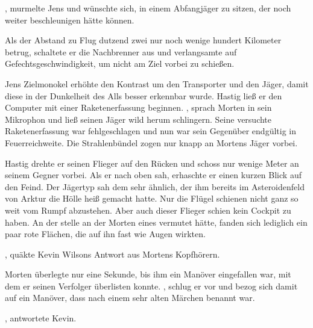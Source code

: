 \par

, murmelte Jens und wünschte sich, in einem Abfangjäger zu sitzen, der noch weiter beschleunigen hätte können.

\par

Als der Abstand zu Flug dutzend zwei nur noch wenige hundert Kilometer betrug, schaltete er die Nachbrenner aus und verlangsamte auf Gefechtsgeschwindigkeit, um nicht am Ziel vorbei zu schießen.

\par

Jens Zielmonokel erhöhte den Kontrast um den Transporter und den Jäger, damit diese in der Dunkelheit des Alls besser erkennbar wurde. Hastig ließ er den Computer mit einer Raketenerfassung beginnen.
\ortswechsel
{}, sprach Morten in sein Mikrophon und ließ seinen Jäger wild herum schlingern. Seine versuchte Raketenerfassung war fehlgeschlagen und nun war sein Gegenüber endgültig in Feuerreichweite. Die Strahlenbündel zogen nur knapp an Mortens Jäger vorbei.

\par

Hastig drehte er seinen Flieger auf den Rücken und schoss nur wenige Meter an seinem Gegner vorbei. Als er nach oben sah, erhaschte er einen kurzen Blick auf den Feind. Der Jägertyp sah dem sehr ähnlich, der ihm bereits im Asteroidenfeld von Arktur die Hölle heiß gemacht hatte. Nur die Flügel schienen nicht ganz so weit vom Rumpf abzustehen. Aber auch dieser Flieger schien kein Cockpit zu haben. An der stelle an der Morten eines vermutet hätte, fanden sich lediglich ein paar rote Flächen, die auf ihn fast wie Augen wirkten.

\par

, quäkte Kevin Wilsons Antwort aus Mortens Kopfhörern. 

\par

Morten überlegte nur eine Sekunde, bis ihm ein Manöver eingefallen war, mit dem er seinen Verfolger überlisten konnte. , schlug er vor und bezog sich damit auf ein Manöver, dass nach einem sehr alten Märchen benannt war.

\par

, antwortete Kevin.

